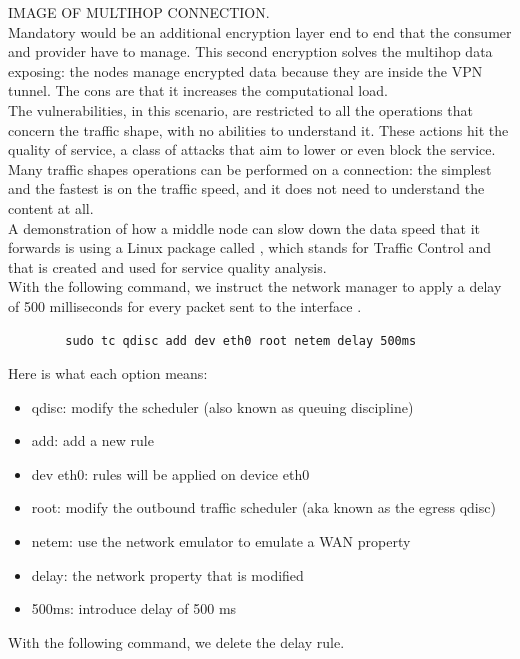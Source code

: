\documentclass[12pt]{article}
\begin{document}
	IMAGE OF MULTIHOP CONNECTION.\\

	Mandatory would be an additional encryption layer end to end that the consumer and provider have to manage. This second encryption solves the multihop data exposing: the nodes manage encrypted data because they are inside the VPN tunnel. The cons are that it increases the computational load.\\
	The vulnerabilities, in this scenario, are restricted to all the operations that concern the traffic shape, with no abilities to understand it. These actions hit the quality of service, a class of attacks that aim to lower or even block the service.\\
	Many traffic shapes operations can be performed on a connection: the simplest and the fastest is on the traffic speed, and it does not need to understand the content at all.\\
	A demonstration of how a middle node can slow down the data speed that it forwards is using a Linux package called  \cite{tc}, which stands for Traffic Control and that is created and used for service quality analysis.\\
	With the following command, we instruct the network manager to apply a delay of 500 milliseconds for every packet sent to the interface .\\
	
	\begin{lstlisting}
		sudo tc qdisc add dev eth0 root netem delay 500ms
	\end{lstlisting}
	
	Here is what each option means:
	\begin{itemize}
		\item qdisc: modify the scheduler (also known as queuing discipline)
		\item add: add a new rule
		\item dev eth0: rules will be applied on device eth0
		\item root: modify the outbound traffic scheduler (aka known as the egress qdisc)
		\item netem: use the network emulator to emulate a WAN property
		\item delay: the network property that is modified
		\item 500ms: introduce delay of 500 ms
	\end{itemize}

	With the following command, we delete the delay rule.\\
\end{document}
